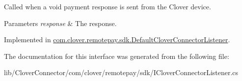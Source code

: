 Called when a void payment response is sent from the Clover device. 


\begin{DoxyParams}{Parameters}
{\em response} & The response.\\
\hline
\end{DoxyParams}


Implemented in \hyperlink{classcom_1_1clover_1_1remotepay_1_1sdk_1_1_default_clover_connector_listener_acbffe77e24ba64632018d6c68dcdda33}{com.\+clover.\+remotepay.\+sdk.\+Default\+Clover\+Connector\+Listener}.



The documentation for this interface was generated from the following file\+:\begin{DoxyCompactItemize}
\item 
lib/\+Clover\+Connector/com/clover/remotepay/sdk/I\+Clover\+Connector\+Listener.\+cs\end{DoxyCompactItemize}
